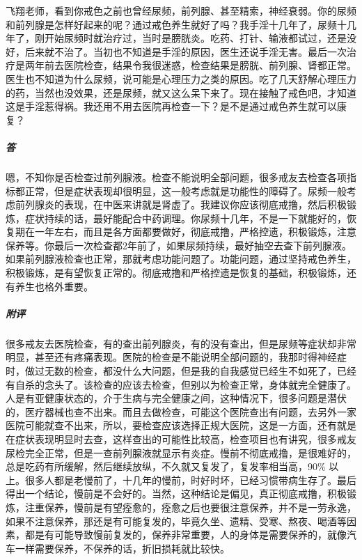 \begin{case}
    飞翔老师，看到你戒色之前也曾经尿频，前列腺、甚至精索，神经衰弱。你的尿频和前列腺是怎样好起来的呢？通过戒色养生就好了吗？我手淫十几年了，尿频十几年了，刚开始尿频时就治疗过，当时是膀胱炎。吃药、打针、输液都试过，还是没好，后来就不治了。当初也不知道是手淫的原因，医生还说手淫无害。最后一次治疗是两年前去医院检查，结果令我很迷惑，检查结果是膀胱、前列腺、肾都正常。医生也不知道为什么尿频，说可能是心理压力之类的原因。吃了几天舒解心理压力的药，当然也没效果，还是尿频，就又这么呆下来了。现在接触了戒色吧，才知道这是手淫惹得祸。我还用不用去医院再检查一下？是不是通过戒色养生就可以康复？
    \subparagraph{答} 嗯，不知你是否检查过前列腺液。检查不能说明全部问题，很多戒友去检查各项指标都正常，但是症状表现却很明显，这一般考虑就是功能性的障碍了。尿频一般考虑前列腺炎的表现，在中医来讲就是肾虚了。我建议你应该彻底戒撸，然后积极锻炼，症状持续的话，最好能配合中药调理。你尿频十几年，不是一下就能好的，恢复期在一年左右，而且是各方面都要做好，彻底戒撸，严格控遗，积极锻炼，注意保养等。你最后一次检查都2年前了，如果尿频持续，最好抽空去查下前列腺液。如果前列腺液检查也正常，那就考虑功能问题了。功能问题，通过坚持戒色养生，积极锻炼，是有望恢复正常的。彻底戒撸和严格控遗是恢复的基础，积极锻炼，还有养生也格外重要。
    \subparagraph{附评} 很多戒友去医院检查，有的查出前列腺炎，有的没有查出，但是尿频等症状却非常明显，甚至还有疼痛表现。医院的检查是不能说明全部问题的，我那时得神经症时，做过无数的检查，都没什么大问题，但是我的自我感觉已经生不如死了，已经有自杀的念头了。该检查的应该去检查，但别以为检查正常，身体就完全健康了。人是有亚健康状态的，介于生病与完全健康之间，这种情况下，很多问题是潜伏的，医疗器械也查不出来。而且去做检查，可能这个医院查出有问题，去另外一家医院可能就查不出来，所以，要检查应该选择正规大医院，这是一方面，还有就是在症状表现明显时去查，这样查出的可能性比较高，检查项目也有讲究，很多戒友尿检完全正常，但是一查前列腺液就显示有炎症。慢前不彻底戒撸，是很难好的，总是吃药有所缓解，然后继续放纵，不久就又复发了，复发率相当高，90\% 以上。很多人都是老慢前了，十几年的慢前，时好时坏，已经习惯带病生存了。最后得出一个结论，慢前是不会好的。当然，这种结论是偏见，真正彻底戒撸，积极锻炼，注重保养，慢前是有望痊愈的，痊愈之后也要很注意保养，并不是一劳永逸，如果不注意保养，那还是有可能复发的，毕竟久坐、遗精、受寒、熬夜、喝酒等因素，都是有可能导致慢前复发的，保养非常重要，人的身体是需要保养的，就像汽车一样需要保养，不保养的话，折旧损耗就比较快。
\end{case}

